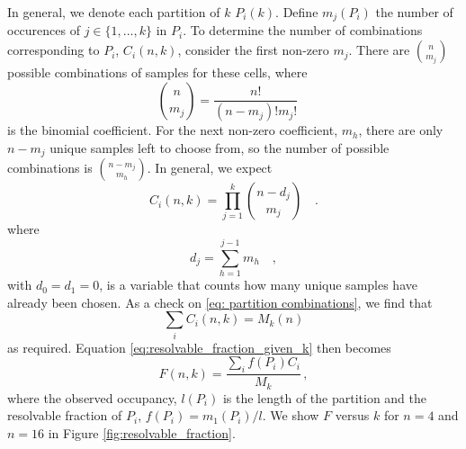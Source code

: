 \documentclass[unnumsec,webpdf,modern,large]{oup-authoring-template}
\begin{document}
	In general, we denote each partition of $k$ $P_i(k)$.
	Define $m_j(P_i)$ the number of occurences of $j \in \lbrace 1, ..., k \rbrace$ in $P_i$.
	To determine the number of combinations corresponding to $P_i$, $C_i(n, k)$, consider the first non-zero $m_j$. 
	There are 
	$\binom{n}{m_j}$
	possible combinations of samples for these cells, where
	\begin{equation}
		\binom {n}{m_j} = \frac{n!}{(n-m_j)! m_j!} \quad 
		\label{eq:combinations}
	\end{equation}
	is the binomial coefficient. 
	For the next non-zero coefficient, $m_h$, there are only $n - m_j$ unique samples left to choose from, so the number of possible combinations is 
	$\binom{n-m_j}{m_h}$. 
	In general, we expect
	\begin{equation}
		C_i(n, k) = \prod_{j=1}^{k} \binom{n - d_j}{m_j} \quad .
		\label{eq: partition combinations}
	\end{equation}
	where 
	\begin{equation}
		d_j = \sum_{h =1}^{j-1} m_h \quad ,
		\label{eq:chosen_sum}
	\end{equation}
	with $d_0 = d_1 = 0$, is a variable that counts how many unique samples have already been chosen. 	
	As a check on \eqref{eq: partition combinations}, we find that 
	\begin{equation}
		\sum_{i} C_i(n, k) = M_k(n)  
		\label{eq:continuity equation} 
	\end{equation}
	as required. 
	Equation \eqref{eq:resolvable_fraction_given_k} then becomes 
	\begin{equation}
		F(n, k) = \frac{ \sum_{i} f(P_i) C_i}{M_k} \, ,
		\label{eq:resolvable fraction}
	\end{equation}
	where the observed occupancy, $l(P_i)$ is the length of the partition and the resolvable fraction of $P_i$, $f(P_i) = m_1(P_i) / l$.
	We show $F$ versus $k$ for $n = 4$ and $n = 16$ in Figure \ref{fig:resolvable_fraction}.	
\end{document}
